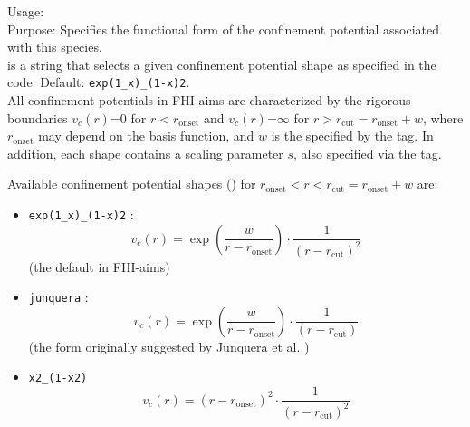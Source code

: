 {
  \noindent
  Usage:   \\[1.0ex]
  Purpose: Specifies the functional form of the confinement potential
    associated with this species. \\[1.0ex]
   is a string that selects a given confinement
    potential shape as specified in the code. Default: \texttt{exp(1\_x)\_(1-x)2}. \\
}
All confinement potentials in FHI-aims are characterized by the rigorous
boundaries $v_c(r)$=0 for $r<r_\text{onset}$ and $v_c(r)$=$\infty$ for
$r>r_\text{cut} = r_\text{onset}+w$, where $r_\text{onset}$ may depend on the basis
function, and $w$ is the  specified by the
   tag. In addition, each shape contains
  a scaling parameter $s$, also specified via the
   tag. 

Available confinement potential shapes () for
$r_\text{onset}<r< r_\text{cut} = r_\text{onset}+w$ are:
\begin{itemize}
  \item \texttt{exp(1\_x)\_(1-x)2} : 
    \[
       v_c(r) = \exp(\frac{w}{r-r_\text{onset}}) \cdot \frac{1}{(r-r_\text{cut})^2} 
    \]
    (the default in FHI-aims)
  \item \texttt{junquera} : 
    \[
       v_c(r) = \exp(\frac{w}{r-r_\text{onset}}) \cdot \frac{1}{(r-r_\text{cut})} 
    \]
    (the form originally suggested by Junquera et al. \cite{Junquera01})
  \item \texttt{x2\_(1-x2)}
    \[
       v_c(r) = (r-r_\text{onset})^2 \cdot \frac{1}{(r-r_\text{cut})^2} 
    \]
\end{itemize}


